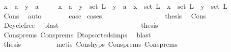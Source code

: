 \begin{isabellebody}
\ {\isachardoublequoteopen}x\ {\isacharequal}{\kern0pt}\ a\ {\isasymand}\ y\ {\isacharequal}{\kern0pt}\ a{\isachardoublequoteclose}\isanewline
\ \ \ \ \ {\isacharbar}{\kern0pt}{\isachardoublequoteopen}x\ {\isacharequal}{\kern0pt}\ a\ {\isasymand}\ y\ {\isasymin}\ set\ L{\isachardoublequoteclose}\ {\isacharbar}{\kern0pt}\ {\isachardoublequoteopen}y\ {\isacharequal}{\kern0pt}\ a\ {\isasymand}\ x\ {\isasymin}\ set\ L{\isachardoublequoteclose}\ {\isacharbar}{\kern0pt}\ {\isachardoublequoteopen}x\ {\isasymin}\ set\ L\ {\isasymand}\ y\ {\isasymin}\ set\ L{\isachardoublequoteclose}\isanewline
\ \ \ \ \isamarkupfalse%
\ Cons\ \isamarkupfalse%
\ auto\isanewline
\ \ \ \ \isamarkupfalse%
\ \isamarkupfalse%
\ {\isacharquery}{\kern0pt}case\ \isamarkupfalse%
{\isacharparenleft}{\kern0pt}cases{\isacharparenright}{\kern0pt}\isanewline
\ \ \ \ \ \ \isamarkupfalse%
\ {}\isanewline
\ \ \ \ \ \ \isamarkupfalse%
\ \isamarkupfalse%
\ {\isacharquery}{\kern0pt}thesis\ \isamarkupfalse%
\ Cons\isanewline
\ \ \ \ \ \ \ \ \isamarkupfalse%
\ D{\isachardot}{\kern0pt}cycle{\isacharunderscore}{\kern0pt}free\ \isamarkupfalse%
\ blast\ \isanewline
\ \ \ \ \isamarkupfalse%
\isanewline
\ \ \ \ \ \ \isamarkupfalse%
\ {}\isanewline
\ \ \ \ \ \ \isamarkupfalse%
\ \isamarkupfalse%
\ {\isacharquery}{\kern0pt}thesis\isanewline
\ \ \ \ \ \ \ \ \isamarkupfalse%
\ Cons{\isachardot}{\kern0pt}prems{\isacharparenleft}{\kern0pt}{}{\isacharparenright}{\kern0pt}\ Cons{\isachardot}{\kern0pt}prems{\isacharparenleft}{\kern0pt}{}{\isacharparenright}{\kern0pt}\ D{\isachardot}{\kern0pt}top{\isacharunderscore}{\kern0pt}sorted{\isachardot}{\kern0pt}simps{\isacharparenleft}{\kern0pt}{}{\isacharparenright}{\kern0pt}\ \isamarkupfalse%
\ blast\ \isanewline
\ \ \ \ \isamarkupfalse%
\isanewline
\ \ \ \ \ \ \isamarkupfalse%
\ {}\isanewline
\ \ \ \ \ \ \isamarkupfalse%
\ \isamarkupfalse%
\ {\isacharquery}{\kern0pt}thesis\isanewline
\ \ \ \ \ \ \ \ \isamarkupfalse%
\ {\isacharparenleft}{\kern0pt}metis\ Cons{\isachardot}{\kern0pt}hyps\ Cons{\isachardot}{\kern0pt}prems{\isacharparenleft}{\kern0pt}{}{\isacharparenright}{\kern0pt}\ Cons{\isachardot}{\kern0pt}prems{\isacharparenleft}{\kern0pt}{}{\isacharparenright}{\kern0pt}\isanewline

\end{isabellebody}
